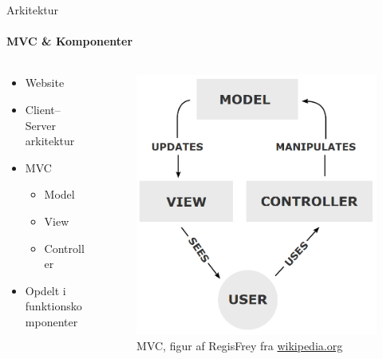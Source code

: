 		\begin{frame}[t]{Arkitektur}\framesubtitle{MVC \& Komponenter}
			\begin{columns}[T]
				\begin{column}{.48\textwidth}
					\begin{itemize}
						\item Website
						\item Client--Server arkitektur
						\item MVC
						\begin{itemize}
							\item Model
							\item View
							\item Controller
						\end{itemize}
						\item Opdelt i funktionskomponenter
					\end{itemize}

				\end{column}
				\begin{column}{.48\textwidth}
					\begin{figure}
						\includegraphics[width=1\textwidth]{images/MVC_2.png}
						\caption{MVC, figur af RegisFrey fra \url{wikipedia.org}}
					\end{figure}
				\end{column}
			\end{columns}
		\end{frame}
		

